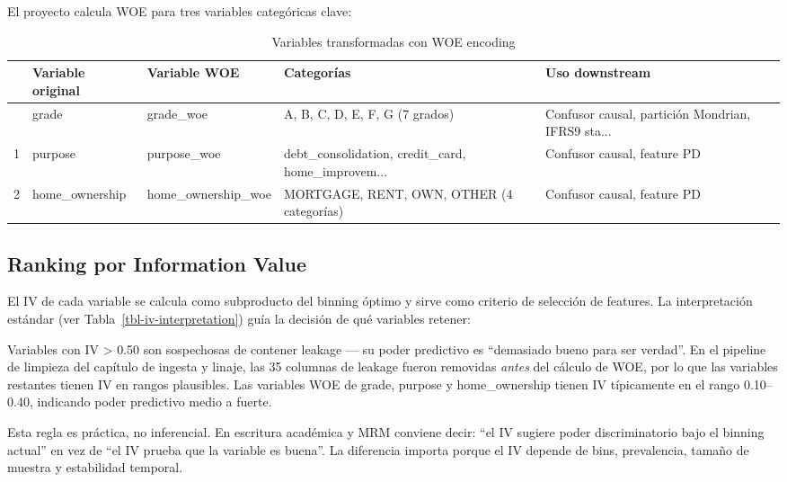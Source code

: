 \documentclass[
  spanish,
  11pt,
  letterpaper,
]{scrbook}
\theoremstyle{plain}
\theoremstyle{remark}
\begin{document}
El proyecto calcula WOE para tres variables categóricas clave:

{

\begin{longtable}[]{@{}lllll@{}}

\caption{\label{tbl-woe-variables}Variables transformadas con WOE
encoding}

\tabularnewline

\toprule\noalign{}
& Variable original & Variable WOE & Categorías & Uso downstream \\
\midrule\noalign{}
\endhead
\bottomrule\noalign{}
\endlastfoot
0 & grade & grade\_woe & A, B, C, D, E, F, G (7 grados) & Confusor
causal, partición Mondrian, IFRS9 sta... \\
1 & purpose & purpose\_woe & debt\_consolidation, credit\_card,
home\_improvem... & Confusor causal, feature PD \\
2 & home\_ownership & home\_ownership\_woe & MORTGAGE, RENT, OWN, OTHER
(4 categorías) & Confusor causal, feature PD \\

\end{longtable}

}

\subsection{Ranking por Information
Value}\label{ranking-por-information-value}

El IV de cada variable se calcula como subproducto del binning óptimo y
sirve como criterio de selección de features. La interpretación estándar
(ver Tabla~\ref{tbl-iv-interpretation}) guía la decisión de qué
variables retener:

\begin{tcolorbox}[enhanced jigsaw, arc=.35mm, bottomrule=.15mm, bottomtitle=1mm, breakable, colback=white, colbacktitle=quarto-callout-tip-color!10!white, colframe=quarto-callout-tip-color-frame, coltitle=black, left=2mm, leftrule=.75mm, opacityback=0, opacitybacktitle=0.6, rightrule=.15mm, title=\textcolor{quarto-callout-tip-color}{\faLightbulb}\hspace{0.5em}{Regla práctica de IV}, titlerule=0mm, toprule=.15mm, toptitle=1mm]

Variables con IV \textgreater{} 0.50 son sospechosas de contener leakage
--- su poder predictivo es ``demasiado bueno para ser verdad''. En el
pipeline de limpieza del capítulo de ingesta y linaje, las 35 columnas
de leakage fueron removidas \emph{antes} del cálculo de WOE, por lo que
las variables restantes tienen IV en rangos plausibles. Las variables
WOE de grade, purpose y home\_ownership tienen IV típicamente en el
rango 0.10--0.40, indicando poder predictivo medio a fuerte.

Esta regla es práctica, no inferencial. En escritura académica y MRM
conviene decir: ``el IV sugiere poder discriminatorio bajo el binning
actual'' en vez de ``el IV prueba que la variable es buena''. La
diferencia importa porque el IV depende de bins, prevalencia, tamaño de
muestra y estabilidad temporal.

\end{tcolorbox}
\end{document}
